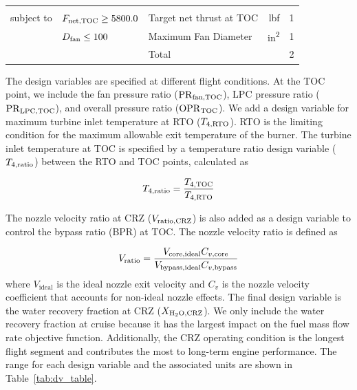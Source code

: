 \documentclass[conf]{new-aiaa}
\begin{document}
\begin{table}[hbt!]
\begin{tabular}{r l l r l}
                    &                                &                                                                          &                &          \\
    subject to      & $F_{\rm{net,TOC}} \geq 5800.0$ & Target net thrust at TOC                                                 & \si{lbf}       & 1        \\
                    & $D_{\rm{fan}} \leq 100$        & Maximum Fan Diameter                                                     & \si{in^2}      & 1        \\
    \cline{3-5}
                    &                                & Total                                                                    &                & 2        \\
    \bottomrule
  \end{tabular}
  \label{tab:opt_problem}
\end{table}

The design variables are specified at different flight conditions.
At the TOC point, we include the fan pressure ratio ($\rm{PR}_{\rm{fan,TOC}}$), LPC pressure ratio ($\rm{PR}_{\rm{LPC,TOC}}$), and overall pressure ratio ($\rm{OPR}_{\rm{TOC}}$).
We add a design variable for maximum turbine inlet temperature at RTO ($T_{4,\rm{RTO}}$).
RTO is the limiting condition for the maximum allowable exit temperature of the burner.
The turbine inlet temperature at TOC is specified by a temperature ratio design variable ($T_{4,\rm{ratio}}$) between the RTO and TOC points, calculated as

\begin{equation}
  T_{4,\rm{ratio}} = \frac{T_{4,\rm{TOC}}}{T_{4,\rm{RTO}}}
  \label{t4ratio}
\end{equation}

\noindent
The nozzle velocity ratio at CRZ ($V_{\rm{ratio,CRZ}}$) is also added as a design variable to control the bypass ratio (BPR) at TOC.
The nozzle velocity ratio is defined as

\begin{equation}
  V_{\rm{ratio}} = \frac{V_{\rm{core,ideal}}C_{v,\rm{core}}}{V_{\rm{bypass,ideal}}C_{v,\rm{bypass}}}
  \label{eq:vratio}
\end{equation}
where $V_\text{ideal}$ is the ideal nozzle exit velocity and $C_v$ is the nozzle velocity coefficient that accounts for non-ideal nozzle effects.
The final design variable is the water recovery fraction at CRZ ($X_{\rm{H_2O,CRZ}}$).
We only include the water recovery fraction at cruise because it has the largest impact on the fuel mass flow rate objective function.
Additionally, the CRZ operating condition is the longest flight segment and contributes the most to long-term engine performance.
The range for each design variable and the associated units are shown in Table~\ref{tab:dv_table}.
\end{document}
